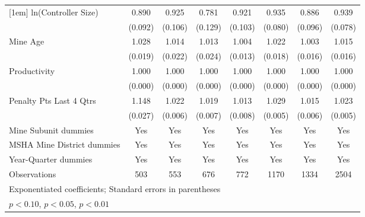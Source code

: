 {\begin{tabular}{l*{7}{c}}
[1em]
ln(Controller Size)      &       0.890         &       0.925         &       0.781         &       0.921         &       0.935         &       0.886         &       0.939         \\
                         &     (0.092)         &     (0.106)         &     (0.129)         &     (0.103)         &     (0.080)         &     (0.096)         &     (0.078)         \\
[1em]
Mine Age                 &       1.028         &       1.014         &       1.013         &       1.004         &       1.022         &       1.003         &       1.015         \\
                         &     (0.019)         &     (0.022)         &     (0.024)         &     (0.013)         &     (0.018)         &     (0.016)         &     (0.016)         \\
[1em]
Productivity             &       1.000         &       1.000         &       1.000\sym{*}  &       1.000         &       1.000         &       1.000         &       1.000\sym{*}  \\
                         &     (0.000)         &     (0.000)         &     (0.000)         &     (0.000)         &     (0.000)         &     (0.000)         &     (0.000)         \\
[1em]
Penalty Pts Last 4 Qtrs  &       1.148\sym{***}&       1.022\sym{***}&       1.019\sym{***}&       1.013         &       1.029\sym{***}&       1.015\sym{**} &       1.023\sym{***}\\
                         &     (0.027)         &     (0.006)         &     (0.007)         &     (0.008)         &     (0.005)         &     (0.006)         &     (0.005)         \\
[1em]
Mine Subunit dummies     &         Yes         &         Yes         &         Yes         &         Yes         &         Yes         &         Yes         &         Yes         \\
[1em]
MSHA Mine District dummies&         Yes         &         Yes         &         Yes         &         Yes         &         Yes         &         Yes         &         Yes         \\
[1em]
Year-Quarter dummies     &         Yes         &         Yes         &         Yes         &         Yes         &         Yes         &         Yes         &         Yes         \\
\hline
Observations             &         503         &         553         &         676         &         772         &        1170         &        1334         &        2504         \\
\hline\hline
\multicolumn{8}{l}{\footnotesize Exponentiated coefficients; Standard errors in parentheses}\\
\multicolumn{8}{l}{\footnotesize \sym{*} \(p<0.10\), \sym{**} \(p<0.05\), \sym{***} \(p<0.01\)}\\
\end{tabular}
}
